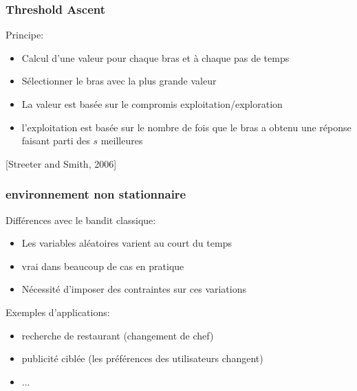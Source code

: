 \documentclass{beamer}
\begin{document}
\begin{frame}
    \frametitle{Threshold Ascent}

    Principe:
    \begin{itemize}
        \item Calcul d'une valeur pour chaque bras et à chaque pas de temps
        \item Sélectionner le bras avec la plus grande valeur
        \item La valeur est basée sur le compromis exploitation/exploration
        \item l'exploitation est basée sur le nombre de fois que le bras a obtenu une réponse faisant parti des $s$ meilleures
    \end{itemize}

    \hfill [Streeter and Smith, 2006]

\end{frame}

\begin{frame}
    \frametitle{environnement non stationnaire}
    Différences avec le bandit classique:
    \begin{itemize}
        \item Les variables aléatoires varient au court du temps
        \item vrai dans beaucoup de cas en pratique
        \item Nécessité d'imposer des contraintes sur ces variations
    \end{itemize}

    Exemples d'applications: 
    \begin{itemize}
        \item recherche de restaurant (changement de chef)
        \item publicité ciblée (les préférences des utilisateurs changent)
        \item ...
    \end{itemize}


\end{frame}
\end{document}
